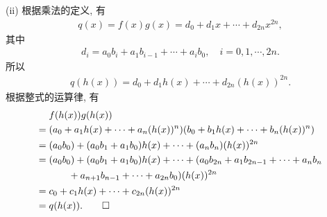 \begin{pf}
    (ii) 根据乘法的定义, 有
    \begin{align*}
        q(x) = f(x) g(x) = d_0 + d_1 x + \cdots + d_{2n} x^{2n},
    \end{align*}
    其中
    \begin{align*}
        d_i = a_0 b_i + a_1 b_{i-1} + \cdots + a_i b_0, \quad i = 0,1,\cdots,2n.
    \end{align*}
    所以
    \begin{align*}
        q(h(x)) = d_0 + d_1 h(x) + \cdots + d_{2n} (h(x))^{2n}.
    \end{align*}
    根据整式的运算律, 有
    \begin{align*}
             & f(h(x)) g(h(x))                                                                               \\
        = {} & (a_0 + a_1 h(x) + \cdots + a_n (h(x))^n) (b_0 + b_1 h(x) + \cdots + b_n (h(x))^n)             \\
        = {} & (a_0 b_0) + (a_0 b_1 + a_1 b_0) h(x) + \cdots + (a_n b_n) (h(x))^{2n}                         \\
        = {} & (a_0 b_0) + (a_0 b_1 + a_1 b_0) h(x) + \cdots + (a_0 b_{2n} + a_1 b_{2n-1} + \cdots + a_n b_n \\
             & \qquad + a_{n+1} b_{n-1} + \cdots + a_{2n} b_0) (h(x))^{2n}                                   \\
        = {} & c_0 + c_1 h(x) + \cdots + c_{2n} (h(x))^{2n}                                                  \\
        = {} & q(h(x)). \qedhere
    \end{align*}

\end{pf}

